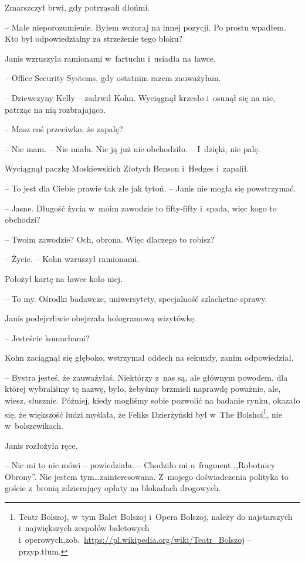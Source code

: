 \documentclass[oneside,polish,11pt,sfheadings]{mwbk}
\begin{document}
Zmarszczył brwi, gdy potrząsali dłońmi.

-- Małe nieporozumienie. Byłem wczoraj na innej pozycji. Po prostu
wpadłem. Kto był odpowiedzialny za strzeżenie tego bloku?

Janis wzruszyła ramionami w~fartuchu i~usiadła na ławce.

-- Office Security Systems, gdy ostatnim razem zauważyłam.

-- Dziewczyny Kelly -- zadrwił Kohn. Wyciągnął krzesło i~osunął się na
nie, patrząc na nią rozbrajająco.

-- Masz coś przeciwko, że zapalę?

-- Nie mam. -- Nie miała. Nic ją już nie obchodziło. -- I~dzięki, nie palę.

Wyciągnął paczkę Moskiewskich Złotych Benson i~Hedges i~zapalił.

-- To jest dla Ciebie prawie tak złe jak tytoń. -- Janis nie mogła się
powstrzymać.

-- Jasne. Długość życia w~moim zawodzie to fifty-fifty i~spada, więc kogo
to obchodzi?

-- Twoim zawodzie? Och, obrona. Więc dlaczego to robisz?

-- Życie. -- Kohn wzruszył ramionami.

Położył kartę na ławce koło niej. 

-- To my. Ośrodki badawcze,
uniwersytety, specjalność szlachetne sprawy.

Janis podejrzliwie obejrzała hologramową wizytówkę.

-- Jesteście komuchami?

Kohn zaciągnął się głęboko, wstrzymał oddech na sekundy, zanim
odpowiedział.

-- Bystra jesteś, że zauważyłaś. Niektórzy z~nas są, ale głównym powodem,
dla której wybraliśmy tę nazwę, było, żebyśmy brzmieli naprawdę
poważnie, ale, wiesz, słusznie. Później, kiedy mogliśmy sobie pozwolić
na badanie rynku, okazało się, że większość ludzi myślała, że Feliks
Dzierżyński był w~The Bolshoi\footnote{Teatr Bolszoj, w~tym Balet Bolszoj i~Opera Bolszoj, należy do najstarszych i~największych zespołów baletowych i~operowych,zob.~\url{https://pl.wikipedia.org/wiki/Teatr\_Bolszoj} -- przyp.tłum.}, nie w~bolszewikach.

Janis rozłożyła ręce.

-- Nic mi to nie mówi -- powiedziała. -- Chodziło mi o~fragment ,,Robotnicy
Obrony''. Nie jestem tym\ldots zainteresowana. Z~mojego doświadczenia
polityka to goście z~bronią zdzierający opłaty na blokadach drogowych.
\end{document}
